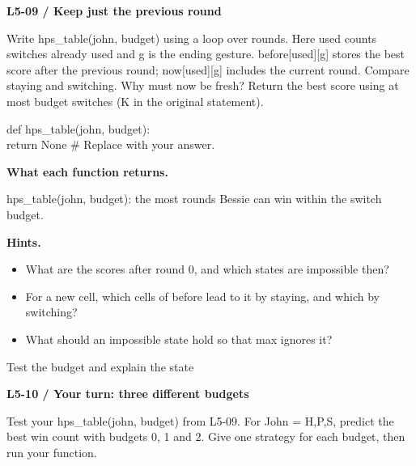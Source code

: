 \documentclass[11pt,a4paper]{article}
\begin{document}
\par\noindent\begin{minipage}{\linewidth}
\textbf{L5-09 / Keep just the previous round}\par\smallskip Write hps\_table(john, budget) using a loop over rounds. Here used counts switches already used and g is the ending gesture. before[used][g] stores the best score after the previous round; now[used][g] includes the current round. Compare staying and switching. Why must now be fresh? Return the best score using at most budget switches (K in the original statement).\par
\par{}\par\smallskip\noindent\colorbox{codepaper}{\parbox{\dimexpr\linewidth-2\fboxsep\relax}{\small\ttfamily\raggedright def hps\_table(john, budget):\\\hspace*{2.4em}return None  \# Replace with your answer.}}\par
{\small\textbf{What each function returns.}\par hps\_table(john, budget): the most rounds Bessie can win within the switch budget.\par }
{\small\textbf{Hints.}}\begin{itemize}\item What are the scores after round 0, and which states are impossible then?\item For a new cell, which cells of before lead to it by staying, and which by switching?\item What should an impossible state hold so that max ignores it?\end{itemize}
\end{minipage}\par\vspace{4mm}
\par\noindent\begin{minipage}{\linewidth}
{\heavy\fontsize{12}{15}\selectfont Test the budget and explain the state\par}\medskip
\textbf{L5-10 / Your turn: three different budgets}\par\smallskip Test your hps\_table(john, budget) from L5-09. For John = H,P,S, predict the best win count with budgets 0, 1 and 2. Give one strategy for each budget, then run your function.\par
\end{minipage}\par\vspace{4mm}
\end{document}
